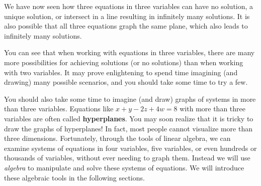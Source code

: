 We have now seen how three equations in three variables can have no solution, a unique solution, or intersect in a line resulting in infinitely many solutions. 
It is also possible that all three equations graph the same plane, which also leads to infinitely many solutions. 

You can see that when working with equations in three variables, there are
many more possibilities for achieving solutions (or no solutions) than when working with two variables. It may prove enlightening to 
spend time imagining (and drawing) many possible scenarios, and you should take some time to try a few. 

You should also take some time to imagine (and draw) graphs of systems in more than three variables. 
Equations  like $x+y-2z+4w=8$ with more than three variables are often called \textbf{hyperplanes}.
You may soon realize that it is tricky to draw the graphs of hyperplanes! In fact, most people cannot visualize more than three dimensions. Fortunately, through the tools of linear algebra, 
we can examine systems of equations in four variables, five variables, or even hundreds or thousands of variables, without ever needing to graph them. Instead we will use {\em algebra} to manipulate and solve these systems of equations. We will introduce these algebraic tools in the following sections.
